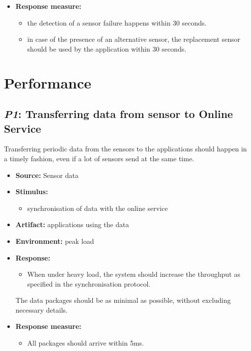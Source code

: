 \documentclass[english]{sareport}
\begin{document}
\begin{itemize}
    \item \textbf{Response measure:}
        \begin{itemize}
            \item the detection of a sensor failure happens within 30 seconds.
            \item in case of the presence of an alternative sensor, the replacement sensor should be used by the application within 30 seconds.
        \end{itemize}
\end{itemize}
\section{Performance}
\subsection{\emph{P1}: Transferring data from sensor to Online Service}
Transferring periodic data from the sensors to the applications should happen in a timely fashion, even if a lot of sensors send at the same time.

\begin{itemize}
    \item \textbf{Source:} Sensor data
    \item \textbf{Stimulus:}
        \begin{itemize}
            \item synchronisation of data with the online service
        \end{itemize}

    \item \textbf{Artifact:} applications using the data
    \item \textbf{Environment:} peak load
    \item \textbf{Response:}
        \begin{itemize}
            \item When under heavy load, the system should increase the throughput as specified in the synchronisation protocol.
        \end{itemize} The data packages should be as minimal as possible, without excluding necessary details.
    \item \textbf{Response measure:}
        \begin{itemize}
            \item All packages should arrive within 5ms.
        \end{itemize}
\end{itemize}
\end{document}
